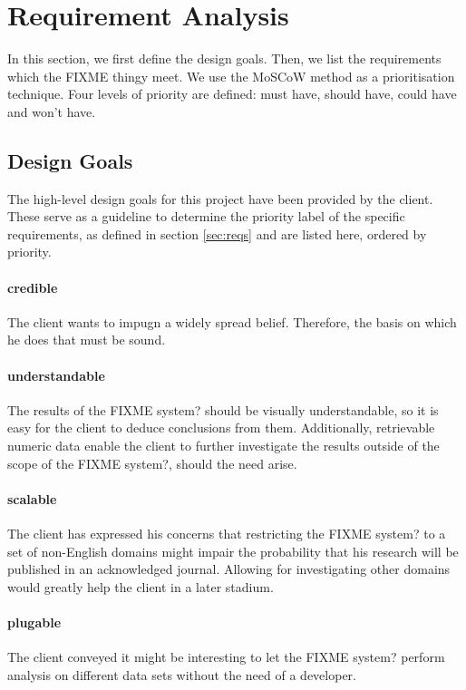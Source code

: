 \section {Requirement Analysis}
In this section, we first define the design goals. Then, we list the requirements which the {\color{red} FIXME thingy} meet. We use the MoSCoW method\cite{clegg1994case} as a prioritisation technique. Four levels of priority are defined: must have, should have, could have and won't have.

\subsection{Design Goals}
The high-level design goals for this project have been provided by the client. These serve as a guideline to determine the priority label of the specific requirements, as defined in section \ref{sec:reqs} and are listed here, ordered by priority.

\paragraph{credible} The client wants to impugn a widely spread belief. Therefore, the basis on which he does that must be sound.
\paragraph{understandable} The results of the {\color{red} FIXME system?} should be visually understandable, so it is easy for the client to deduce conclusions from them. Additionally, retrievable numeric data enable the client to further investigate the results outside of the scope of the {\color{red} FIXME system?}, should the need arise.
\paragraph{scalable} The client has expressed his concerns that restricting the {\color{red} FIXME system?} to a set of non-English domains might impair the probability that his research will be published in an acknowledged journal. Allowing for investigating other domains would greatly help the client in a later stadium.
\paragraph{plugable} The client conveyed it might be interesting to let the {\color{red} FIXME system?} perform analysis on different data sets without the need of a developer. 

